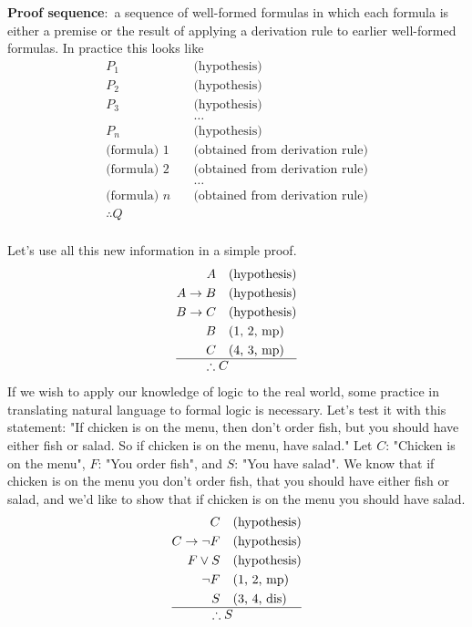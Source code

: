 \documentclass[nobib]{tufte-handout}
\newcommand{\defn}[2]{\noindent\textbf{#1}:\ #2}
\begin{document}
\defn{Proof sequence}{a sequence of well-formed formulas 
in which each formula is either a premise or the result 
of applying a derivation rule to earlier well-formed formulas.} In practice this looks like
\begin{align*}
    P_1 \quad &\text{(hypothesis)}\\
    P_2 \quad &\text{(hypothesis)}\\
    P_3 \quad &\text{(hypothesis)}\\
    &\dots \\
    P_n \quad &\text{(hypothesis)}\\
    \text{(formula) }1 \quad &\text{(obtained from derivation rule)} \\
    \text{(formula) }2 \quad &\text{(obtained from derivation rule)} \\
    &\dots \\
    \text{(formula) } n \quad &\text{(obtained from derivation rule)} \\
    \therefore Q \\
\end{align*}

Let's use all this new information in a simple proof. 
\begin{align*}
    A \quad &\text{(hypothesis)}\\
    A \rightarrow B \quad &\text{(hypothesis)}\\
    B \rightarrow C \quad &\text{(hypothesis)}\\
    B \quad &\text{(1, 2, mp)}\\
    C \quad &\text{(4, 3, mp)}\\
    \hline
    \therefore C \notag
\end{align*}
If we wish to apply our knowledge of logic to the real world, 
some practice in translating natural language to formal logic 
is necessary. Let's test it with this statement: "If chicken is on
the menu, then don't order fish, but you should have either fish or salad.
So if chicken is on the menu, have salad." 
Let $C$: "Chicken is on the menu", $F$: "You order fish", and $S$: "You have salad".
We know that if chicken is on the menu you don't order fish, that you should have
either fish or salad, and we'd like to show that if chicken is on the menu 
you should have salad.
\begin{align*}
    C \quad &\text{(hypothesis)}\\
    C \rightarrow \neg F \quad &\text{(hypothesis)}\\
    F \lor S \quad &\text{(hypothesis)}\\
    \neg F \quad &\text{(1, 2, mp)}\\
    S \quad &\text{(3, 4, dis)}\\
    \hline
    \therefore S \notag
\end{align*}
\end{document}
